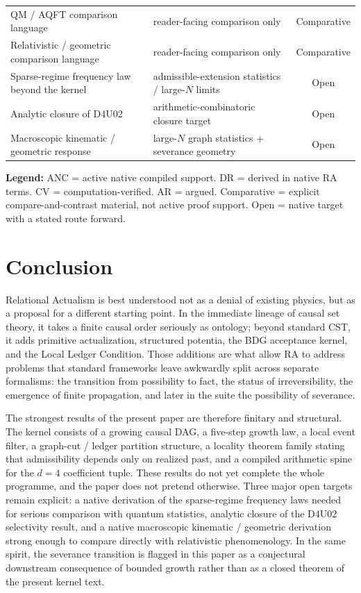 \documentclass[11pt]{article}
\begin{document}
\begin{center}
\begin{tabular}{llc}
QM / AQFT comparison language & reader-facing comparison only & Comparative \\
Relativistic / geometric comparison language & reader-facing comparison only & Comparative \\
Sparse-regime frequency law beyond the kernel & admissible-extension statistics / large-$N$ limits & Open \\
Analytic closure of D4U02 & arithmetic-combinatoric closure target & Open \\
Macroscopic kinematic / geometric response & large-$N$ graph statistics + severance geometry & Open \\
\bottomrule
\end{tabular}
\end{center}

\textbf{Legend:} ANC = active native compiled support. DR = derived in native RA terms. CV = computation-verified. AR = argued. Comparative = explicit compare-and-contrast material, not active proof support. Open = native target with a stated route forward.

\section{Conclusion}
\label{sec:conclusion}

Relational Actualism is best understood not as a denial of existing physics, but as a proposal for a different starting point. In the immediate lineage of causal set theory, it takes a finite causal order seriously as ontology; beyond standard CST, it adds primitive actualization, structured potentia, the BDG acceptance kernel, and the Local Ledger Condition. Those additions are what allow RA to address problems that standard frameworks leave awkwardly split across separate formalisms: the transition from possibility to fact, the status of irreversibility, the emergence of finite propagation, and later in the suite the possibility of severance.

The strongest results of the present paper are therefore finitary and structural. The kernel consists of a growing causal DAG, a five-step growth law, a local event filter, a graph-cut / ledger partition structure, a locality theorem family stating that admissibility depends only on realized past, and a compiled arithmetic spine for the $d=4$ coefficient tuple. These results do not yet complete the whole programme, and the paper does not pretend otherwise. Three major open targets remain explicit: a native derivation of the sparse-regime frequency laws needed for serious comparison with quantum statistics, analytic closure of the D4U02 selectivity result, and a native macroscopic kinematic / geometric derivation strong enough to compare directly with relativistic phenomenology. In the same spirit, the severance transition is flagged in this paper as a conjectural downstream consequence of bounded growth rather than as a closed theorem of the present kernel text.
\end{document}
